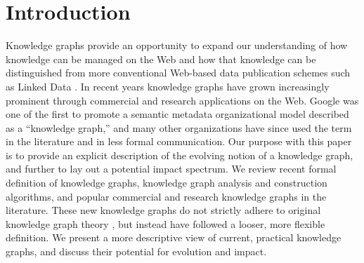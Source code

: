 \section{Introduction}


Knowledge graphs provide an opportunity to expand our understanding of how knowledge can be managed on the Web and how that knowledge can be distinguished from more conventional Web-based data publication schemes such as Linked Data \cite{bizer2009linked}.
In recent years knowledge graphs have grown increasingly prominent through commercial and research applications on the Web.
Google was one of the first to promote a semantic metadata organizational model described as a ``knowledge graph,'' \cite{singhal2012introducing} and many other organizations have since used the term in the literature and in less formal communication.
Our purpose with this paper is to provide an explicit description of the evolving notion of a knowledge graph, and further to lay out a potential impact spectrum.  
We review recent formal definition of knowledge graphs, knowledge graph analysis and construction algorithms, and popular commercial and research knowledge graphs in the literature.
These new knowledge graphs do not strictly adhere to original knowledge graph theory \cite{van1992knowledge}, but instead have followed a looser, more flexible definition.
We present a more descriptive view of current, practical knowledge graphs, and discuss their potential for evolution and impact.